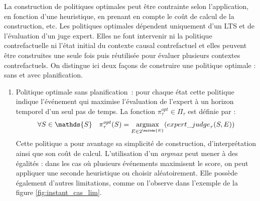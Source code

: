 La construction de politiques optimales peut être contrainte selon l'application, en fonction d'une heuristique, en prenant en compte le coût de calcul de la construction, etc. Les politiques optimales dépendent uniquement d'un LTS et de l'évaluation d'un juge expert. Elles ne font intervenir ni la politique contrefactuelle ni l'état initial du contexte causal contrefactuel et elles peuvent être construites une seule fois puis réutilisée pour évaluer plusieurs contextes contrefactuels. On distingue ici deux façons de construire une politique optimale : sans et avec planification.
 \begin{enumerate}
     \item Politique optimale sans planification : pour chaque état cette politique indique l'événement qui maximise l'évaluation de l'expert à un horizon temporel d'un seul pas de temps.  La fonction $\pi_\tau^{opt}\in \Pi_\tau$ est définie par :
     \begin{equation}\label{pi_instan}
            \forall S\in \mathds{S} \quad \pi^{opt}_\tau(S) = \underset{E \in 2 ^{\mathds{E}}}{\argmax} (expert\_{judge}_\tau(S,E))
     \end{equation}
     Cette politique a pour avantage sa simplicité de construction, d'interprétation ainsi que son coût de calcul. L'utilisation d'un \textit{argmax} peut mener à des égalités : dans les cas où plusieurs événements maximisent le score, on peut appliquer une seconde heuristique ou choisir aléatoirement. Elle possède également d'autres limitations, comme on l'observe dans l'exemple de la figure \ref{fig:instant_cas_lim}.


\end{enumerate}
